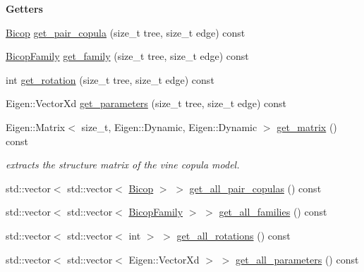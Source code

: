 \begin{Indent}{\bf Getters}\par
\begin{DoxyCompactItemize}
\item 
\hyperlink{classvinecopulib_1_1_bicop}{Bicop} \hyperlink{classvinecopulib_1_1_vinecop_aafcde16d37dbcef74af9158cdf525169}{get\+\_\+pair\+\_\+copula} (size\+\_\+t tree, size\+\_\+t edge) const 
\item 
\hyperlink{namespacevinecopulib_a42e95cc06d33896199caab0c11ad44f3}{Bicop\+Family} \hyperlink{classvinecopulib_1_1_vinecop_a4b27e03bb944bfc062b0aff2a6b540e8}{get\+\_\+family} (size\+\_\+t tree, size\+\_\+t edge) const 
\item 
int \hyperlink{classvinecopulib_1_1_vinecop_a985513046c1f06f6bcc1af376bae5e9d}{get\+\_\+rotation} (size\+\_\+t tree, size\+\_\+t edge) const 
\item 
Eigen\+::\+Vector\+Xd \hyperlink{classvinecopulib_1_1_vinecop_a96da7f2517bb19f7fe22c3380f3b4f26}{get\+\_\+parameters} (size\+\_\+t tree, size\+\_\+t edge) const 
\item 
Eigen\+::\+Matrix$<$ size\+\_\+t, Eigen\+::\+Dynamic, Eigen\+::\+Dynamic $>$ \hyperlink{classvinecopulib_1_1_vinecop_a615b96629e2c97299f0b904d8ccc5b76}{get\+\_\+matrix} () const \hypertarget{classvinecopulib_1_1_vinecop_a615b96629e2c97299f0b904d8ccc5b76}{}\label{classvinecopulib_1_1_vinecop_a615b96629e2c97299f0b904d8ccc5b76}

\begin{DoxyCompactList}\small\item\em extracts the structure matrix of the vine copula model. \end{DoxyCompactList}\item 
std\+::vector$<$ std\+::vector$<$ \hyperlink{classvinecopulib_1_1_bicop}{Bicop} $>$ $>$ \hyperlink{classvinecopulib_1_1_vinecop_acb041d08afd6b7efac4f3769273300d7}{get\+\_\+all\+\_\+pair\+\_\+copulas} () const 
\item 
std\+::vector$<$ std\+::vector$<$ \hyperlink{namespacevinecopulib_a42e95cc06d33896199caab0c11ad44f3}{Bicop\+Family} $>$ $>$ \hyperlink{classvinecopulib_1_1_vinecop_adcb572c440756a00dfaea0188caffb85}{get\+\_\+all\+\_\+families} () const 
\item 
std\+::vector$<$ std\+::vector$<$ int $>$ $>$ \hyperlink{classvinecopulib_1_1_vinecop_a7cbfca10a16e4c45f4b5d94343b5fc20}{get\+\_\+all\+\_\+rotations} () const 
\item 
std\+::vector$<$ std\+::vector$<$ Eigen\+::\+Vector\+Xd $>$ $>$ \hyperlink{classvinecopulib_1_1_vinecop_a3ab6a85281503d42f3a07036001bd657}{get\+\_\+all\+\_\+parameters} () const 
\end{DoxyCompactItemize}
\end{Indent}
